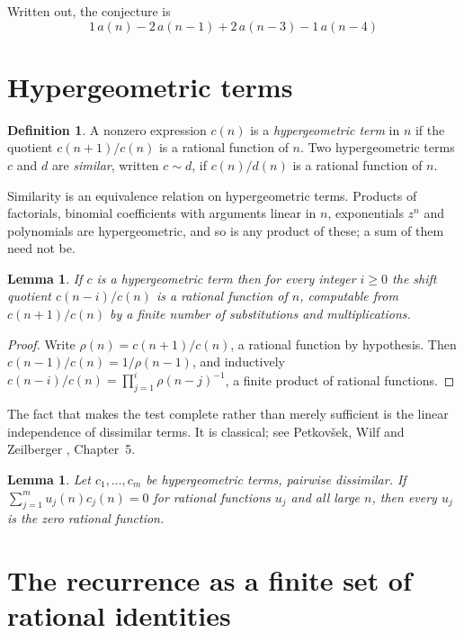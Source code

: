 \documentclass[11pt,a4paper]{article}
\theoremstyle{plain}
\newtheorem{lemma}[theorem]{Lemma}
\theoremstyle{definition}
\newtheorem{definition}[theorem]{Definition}
\begin{document}
Written out, the conjecture is
\begin{equation}\label{eq:conj}
1\,a(n) - 2\,a(n-1) + 2\,a(n-3) - 1\,a(n-4)
\end{equation}

\section{Hypergeometric terms}

\begin{definition}
A nonzero expression $c(n)$ is a \emph{hypergeometric term} in $n$ if the quotient
$c(n+1)/c(n)$ is a rational function of $n$. Two hypergeometric terms $c$ and $d$ are
\emph{similar}, written $c\sim d$, if $c(n)/d(n)$ is a rational function of $n$.
\end{definition}

Similarity is an equivalence relation on hypergeometric terms. Products of factorials,
binomial coefficients with arguments linear in $n$, exponentials $z^{n}$ and polynomials
are hypergeometric, and so is any product of these; a sum of them need not be.

\begin{lemma}\label{lem:shift}
If $c$ is a hypergeometric term then for every integer $i\ge 0$ the shift quotient
$c(n-i)/c(n)$ is a rational function of $n$, computable from $c(n+1)/c(n)$ by a finite
number of substitutions and multiplications.
\end{lemma}

\begin{proof}
Write $\rho(n)=c(n+1)/c(n)$, a rational function by hypothesis. Then
$c(n-1)/c(n)=1/\rho(n-1)$, and inductively
$c(n-i)/c(n)=\prod_{j=1}^{i}\rho(n-j)^{-1}$, a finite product of rational functions.
\end{proof}

The fact that makes the test complete rather than merely sufficient is the linear
independence of dissimilar terms. It is classical; see Petkov\v{s}ek, Wilf and Zeilberger
\cite{AB}, Chapter~5.

\begin{lemma}\label{lem:indep}
Let $c_{1},\dots,c_{m}$ be hypergeometric terms, pairwise dissimilar. If
$\sum_{j=1}^{m}u_{j}(n)c_{j}(n)=0$ for rational functions $u_{j}$ and all large $n$, then
every $u_{j}$ is the zero rational function.
\end{lemma}

\section{The recurrence as a finite set of rational identities}
\end{document}
